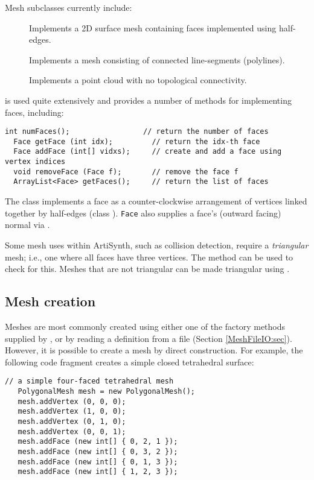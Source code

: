 Mesh subclasses currently include:

\begin{description}

\item[]\mbox{}

Implements a 2D surface
mesh containing faces implemented using half-edges.

\item[]\mbox{}

Implements a mesh
consisting of connected line-segments (polylines).

\item[]\mbox{}

Implements a point cloud with
no topological connectivity.

\end{description}

 is used quite extensively
and provides a number of methods for implementing faces, including:
%
\begin{lstlisting}[]
  int numFaces();                 // return the number of faces
  Face getFace (int idx);         // return the idx-th face
  Face addFace (int[] vidxs);     // create and add a face using vertex indices
  void removeFace (Face f);       // remove the face f
  ArrayList<Face> getFaces();     // return the list of faces
\end{lstlisting}
%
The class  implements a face as a
counter-clockwise arrangement of vertices linked together by
half-edges (class ).
{\tt Face} also supplies a face's (outward facing) normal
via 
.

Some mesh uses within ArtiSynth, such as collision detection, require a
{\it triangular} mesh; i.e., one where all faces have three vertices.
The method 
can be used to check for this. Meshes that are not triangular can be
made triangular using 
.

\subsection{Mesh creation}

Meshes are most commonly created using either one of the factory
methods supplied by , or by reading a
definition from a file (Section \ref{MeshFileIO:sec}).  However, it is
possible to create a mesh by direct construction. For example, the
following code fragment creates a simple closed tetrahedral surface:
%
\begin{lstlisting}[]
   // a simple four-faced tetrahedral mesh 
   PolygonalMesh mesh = new PolygonalMesh();
   mesh.addVertex (0, 0, 0);
   mesh.addVertex (1, 0, 0);
   mesh.addVertex (0, 1, 0);
   mesh.addVertex (0, 0, 1);
   mesh.addFace (new int[] { 0, 2, 1 });
   mesh.addFace (new int[] { 0, 3, 2 });
   mesh.addFace (new int[] { 0, 1, 3 });
   mesh.addFace (new int[] { 1, 2, 3 });      
\end{lstlisting}
%


